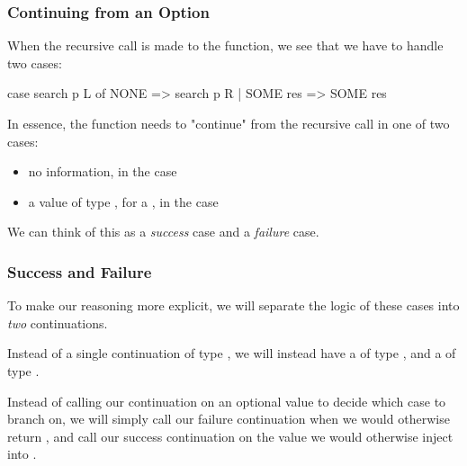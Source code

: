 \documentclass[aspectratio=169]{beamer}
\begin{document}
\begin{frame}[fragile]
  \frametitle{Continuing from an Option}

  When the recursive call is made to the function, we see that we have to handle
  two cases:
  \begin{codeblock}
    case search p L of
      NONE => search p R
    | SOME res => SOME res
  \end{codeblock}

  In essence, the function needs to "continue" from the recursive call in
  one of two cases: 
  \begin{itemize}
    \item no information, in the  case
    \item a value of type , for a , in the  case
  \end{itemize}

  We can think of this as a \textit{success} case and a \textit{failure} case.
\end{frame}

\begin{frame}[fragile]
  \frametitle{Success and Failure}

  To make our reasoning more explicit, we will separate the logic of these 
  cases into \textit{two} continuations.

  Instead of a single continuation of type ,
  we will instead have a  of type ,
  and a  of type . 

  Instead of calling our continuation on an optional value to decide which
  case to branch on, we will simply call our failure continuation when we
  would otherwise return , and call our success continuation
  on the value we would otherwise inject into .
\end{frame}
\end{document}
